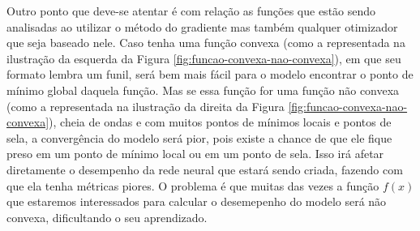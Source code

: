 Outro ponto que deve-se atentar é com relação as funções que estão sendo analisadas ao utilizar o método do gradiente mas também qualquer otimizador que seja baseado nele. Caso tenha uma função convexa (como a representada na ilustração da esquerda da Figura \ref{fig:funcao-convexa-nao-convexa}), em que seu formato lembra um funil, será bem mais fácil para o modelo encontrar o ponto de mínimo global daquela função. Mas se essa função for uma função não convexa (como a representada na ilustração da direita da Figura \ref{fig:funcao-convexa-nao-convexa}), cheia de ondas e com muitos pontos de mínimos locais e pontos de sela, a convergência do modelo será pior, pois existe a chance de que ele fique preso em um ponto de mínimo local ou em um ponto de sela. Isso irá afetar diretamente o desempenho da rede neural que estará sendo criada, fazendo com que ela tenha métricas piores. O problema é que muitas das vezes a função $f(x)$ que estaremos interessados para calcular o desemepenho do modelo será não convexa, dificultando o seu aprendizado.

